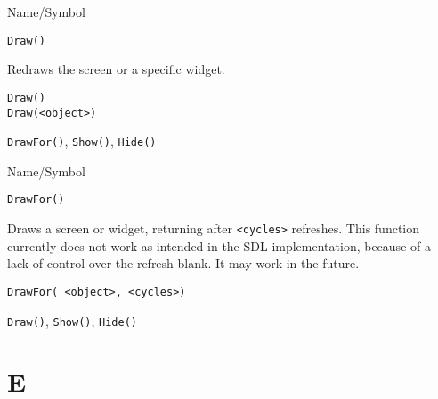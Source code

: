 \begin{desc}{Name/Symbol}
\item[Name/Symbol]	\verb+Draw()+

\item[Description]	Redraws the screen or a specific widget.

\item[Usage]
\begin{verbatim}
Draw()
Draw(<object>)
\end{verbatim}

\item[Example]	

\item[See Also]	\verb+DrawFor()+, \verb+Show()+, \verb+Hide()+
\end{desc}

\rl



\begin{desc}{Name/Symbol}
\item[Name/Symbol]	\verb+DrawFor()+

\item[Description] Draws a screen or widget, returning after
  \verb+<cycles>+ refreshes. This function currently does not work as
  intended in the SDL implementation, because of a lack of control
  over the refresh blank.  It may work in the future.

\item[Usage]
\begin{verbatim}
DrawFor( <object>, <cycles>)
\end{verbatim}

\item[Example]	

\item[See Also]	\verb+Draw()+, \verb+Show()+, \verb+Hide()+
\end{desc}

\rl
\section{E}
\rl




